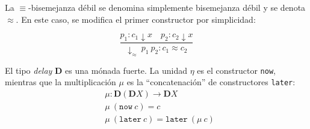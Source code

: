 La $\equiv$-bisemejanza débil se denomina simplemente bisemejanza débil y se denota $\approx$. En este caso, se modifica el primer constructor por simplicidad:

\begin{equation*}
\dfrac{p_1 : c_1 \downarrow x \quad p_2 : c_2 \downarrow x}{\downarrow_{\approx} \ p_1 \ p_2 : c_1 \approx c_2}
\end{equation*}

El tipo \textit{delay} $\mathbf{D}$ es una mónada fuerte. La unidad $\eta$ es el constructor \texttt{now}, mientras que la multiplicación $\mu$ es la ``concatenación'' de constructores \texttt{later}:
\begin{align*}
& \mu : \mathbf{D} (\mathbf{D} X) \rightarrow \mathbf{D} X  \\
& \mu \ (\mathtt{now} \ c) = c \\
& \mu \ (\mathtt{later} \ c) = \mathtt{later} \ (\mu \ c)
\end{align*}